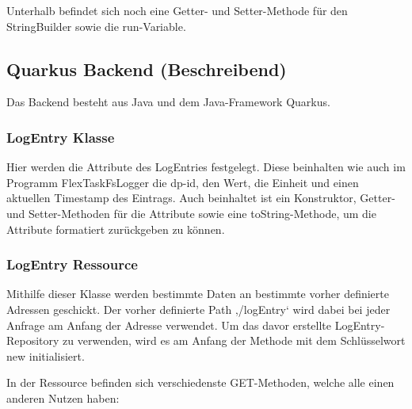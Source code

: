 Unterhalb befindet sich noch eine Getter- und Setter-Methode für den StringBuilder sowie die run-Variable.
 
\subsection{Quarkus Backend (Beschreibend)}
Das Backend besteht aus Java und dem Java-Framework Quarkus.
 
\subsubsection{LogEntry Klasse}
Hier werden die Attribute des LogEntries festgelegt. Diese beinhalten wie auch im Programm FlexTaskFsLogger die dp-id, den Wert, die Einheit und einen aktuellen Timestamp des Eintrags.
Auch beinhaltet ist ein Konstruktor, Getter- und Setter-Methoden für die Attribute sowie eine toString-Methode, um die Attribute formatiert zurückgeben zu können.
 
\subsubsection{LogEntry Ressource}
Mithilfe dieser Klasse werden bestimmte Daten an bestimmte vorher definierte Adressen geschickt.
Der vorher definierte Path ‚/logEntry‘ wird dabei bei jeder Anfrage am Anfang der Adresse verwendet.
Um das davor erstellte LogEntry-Repository zu verwenden, wird es am Anfang der Methode mit dem Schlüsselwort new initialisiert.
 
In der Ressource befinden sich verschiedenste GET-Methoden, welche alle einen anderen Nutzen haben:
 
